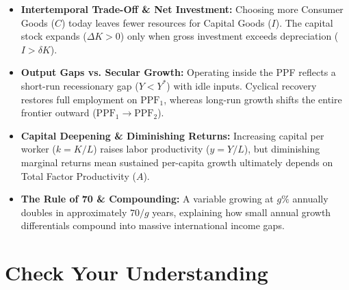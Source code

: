 \documentclass[11pt,letterpaper]{article}
\begin{document}
\begin{takeaways}
\begin{itemize}
  \item \textbf{Intertemporal Trade-Off \& Net Investment:} Choosing more Consumer Goods ($C$) today leaves fewer resources for Capital Goods ($I$). The capital stock expands ($\Delta K > 0$) only when gross investment exceeds depreciation ($I > \delta K$).
  \item \textbf{Output Gaps vs. Secular Growth:} Operating inside the PPF reflects a short-run recessionary gap ($Y < Y^*$) with idle inputs. Cyclical recovery restores full employment on $\text{PPF}_1$, whereas long-run growth shifts the entire frontier outward ($\text{PPF}_1 \to \text{PPF}_2$).
  \item \textbf{Capital Deepening \& Diminishing Returns:} Increasing capital per worker ($k = K/L$) raises labor productivity ($y = Y/L$), but diminishing marginal returns mean sustained per-capita growth ultimately depends on Total Factor Productivity ($A$).
  \item \textbf{The Rule of 70 \& Compounding:} A variable growing at $g\%$ annually doubles in approximately $70 / g$ years, explaining how small annual growth differentials compound into massive international income gaps.
\end{itemize}
\end{takeaways}

\section*{Check Your Understanding}
\end{document}
